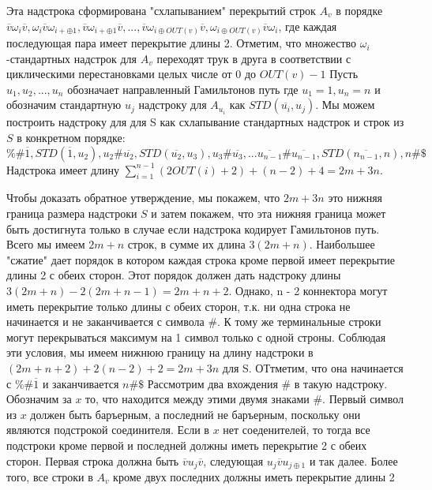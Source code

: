 \documentclass[11pt,a4paper]{article}
\begin{document}
Эта надстрока сформирована "схлапыванием" перекрытий строк $A_v$ в порядке
$\overline{v}\omega_i\overline{v}, \omega_i\overline{v}\omega_{i + \oplus 1}, \overline{v}\omega_{i + \oplus1}\overline{v}, ...,
\overline{v}\omega_{i \oplus OUT(v)}\overline{v}, \omega_{i \oplus OUT(v)}\overline{v}\omega_i$, где каждая последующая пара имеет перекрытие длины 2.
 Отметим, что множество $\omega_i$-стандартных надстрок для $A_v$ переходят трук в друга в соответствии с циклическими перестановками целых числе от $0$ до $OUT(v) - 1$
Пусть $u_1, u_2, ..., u_n$ обозначает направленный Гамильтонов путь где $u_1 = 1, u_n = n$ и обозначим стандартную $u_j$ надстроку для $A_{u_i}$ как $STD(\overline{u_i}, u_j)$.
Мы можем построить надстроку для для S как схлапывание стандартных надстрок и строк из $S$ в конкретном порядке:
$\%\#\overline{1}, STD(\overline{1}, u_2), u_2 \# \overline{u_2}, STD(\overline{u_2}, u_3), u_3\#\overline{u_3}, ...
\overline{u_{n - 1}}\#\overline{u_{n - 1}}, STD(\overline{n_{n - 1}}, n), n\#\$$
Надстрока имеет длину $\sum\limits_{i = 1}^{n - 1} (2OUT(i) + 2) + (n - 2) + 4 = 2m + 3n$.
\par
Чтобы доказать обратное утверждение, мы покажем, что $2m + 3n$ это нижняя граница размера надстроки $S$ и затем покажем, что эта нижняя граница может быть достигнута только в случае если надстрока
кодирует Гамильтонов путь. Всего мы имеем $2m + n$ строк, в сумме их длина $3(2m + n)$. Наибольшее "сжатие" дает порядок в котором каждая строка кроме первой имеет перекрытие длины 2 с обеих сторон.
Этот порядок должен дать надстроку длины $3(2m + n) - 2(2m + n - 1) = 2m + n + 2$. Однако, n - 2 коннектора могут иметь перекрытие только длины с обеих сторон,
т.к. ни одна строка не начинается и не заканчивается с символа $\#$.
К тому же терминальные строки могут перекрываться максимум на 1 символ только с одной строны. Соблюдая эти условия, мы имеем нижнюю границу на длину надстроки в
$(2m + n + 2) + 2(n - 2) + 2 = 2m + 3n$ для S. ОТтметим, что она начинается с $\%\#\overline{1}$ и заканчивается $n\#\$$
Рассмотрим два вхождения $\#$ в такую надстроку. Обозначим за $x$ то, что находится между этими двумя знаками $\#$. Первый символ из $x$ должен быть баръерным, а
последний не баръерным, поскольку они являются подстрокой соединителя. Если в $x$ нет соеденителей, то тогда все подстроки кроме первой и последней должны иметь перекрытие 2 с обеих сторон.
Первая строка должна быть $\overline{v}u_j\overline{v}$, следующая $u_j\overline{v}u_{j \oplus 1}$ и так далее. Более того, все строки в $A_v$ кроме двух последних должны иметь перекрытие длины 2
\end{document}
